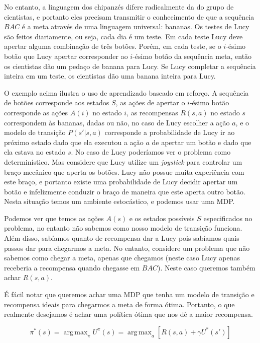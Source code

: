 \documentclass[a4paper,10pt]{article}
\DeclareMathOperator*{\argmax}{arg\,max}
\theoremstyle{plain}
\begin{document}
No entanto, a linguagem dos chipanzés difere radicalmente da do grupo de cientistas, e portanto
eles precisam transmitir o conhecimento de que a sequência $BAC$ é a meta através de uma linguagem
universal: bananas. Os testes de Lucy são feitos diariamente, ou seja, cada dia é um teste. Em cada
teste Lucy deve apertar alguma combinação de três botões. Porém, em cada teste, se o $i$-ésimo
botão que Lucy apertar corresponder ao $i$-ésimo botão da sequência meta, então os cientistas dão
um pedaço de banana para Lucy. Se Lucy completar a sequência inteira em um teste, os cientistas dão
uma banana inteira para Lucy.

O exemplo acima ilustra o uso de aprendizado baseado em reforço. A sequência de botões corresponde
aos estados $S$, as ações de apertar o $i$-ésimo botão corresponde as ações $A(i)$ no estado $i$,
as recompensas $R(s,a)$ no estado $s$ correspondem às bananas, dadas ou não, no caso de Lucy
escolher a ação $a$, e o modelo de transição $P(s'|s,a)$ corresponde a probabilidade de Lucy ir ao
próximo estado dado que ela executou a ação $a$ de apertar um botão e dado que ela estava no estado
$s$. No caso de Lucy poderíamos ver o problema como determinístico. Mas considere que Lucy utilize
um \textit{joystick} para controlar um braço mecânico que aperta os botões. Lucy não possue muita
experiência com este braço, e portanto existe uma probabilidade de Lucy decidir apertar um botão e
infelizmente conduzir o braço de maneira que este aperta outro botão. Nesta situação temos um
ambiente estocástico, e podemos usar uma MDP.

Podemos ver que temos as ações $A(s)$ e os estados possíveis $S$ especificados no problema, no
entanto não sabemos como nosso modelo de transição funciona. Além disso, sabíamos quanto de
recompensa dar a Lucy pois sabíamos quais passos dar para chegarmos a meta. No entanto, considere
um problema que não sabemos como chegar a meta, apenas que chegamos (neste caso Lucy apenas
receberia a recompensa quando chegasse em $BAC$). Neste caso queremos também achar $R(s,a)$.

É fácil notar que queremos achar uma MDP que tenha um modelo de transição e recompensa ideais para
chegarmos a meta de forma ótima. Portanto, o que realmente desejamos é achar uma política ótima que
nos dê a maior recompensa.

\begin{equation*}
  \pi^*(s) = \argmax_\pi U^\pi(s) = \argmax_a [R(s, a) + \gamma U^*(s')]
\end{equation*}
\end{document}
